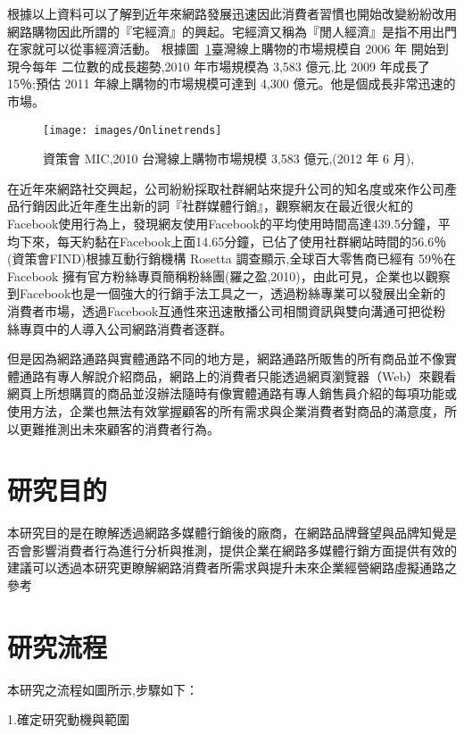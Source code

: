 根據以上資料可以了解到近年來網路發展迅速因此消費者習慣也開始改變紛紛改用網路購物因此所謂的『宅經濟』的興起。宅經濟又稱為『閒人經濟』是指不用出門在家就可以從事經濟活動。
根據圖~\ref{fig:Onlinetrends}臺灣線上購物的市場規模自 2006 年 開始到現今每年 二位數的成長趨勢,2010 年市場規模為 3,583 億元,比 2009 年成長了 15％;預估 2011 年線上購物的市場規模可達到 4,300 億元\cite{資策會FIND}。他是個成長非常迅速的市場。

\begin{figure}[htbp]
\centering \texttt{[image: images/Onlinetrends]}
\caption{\label{fig:Onlinetrends}資策會 MIC,2010 台灣線上購物市場規模 3,583 億元,(2012 年 6 月),}
\end{figure}

在近年來網路社交興起，公司紛紛採取社群網站來提升公司的知名度或來作公司產品行銷因此近年產生出新的詞『社群媒體行銷』，觀察網友在最近很火紅的Facebook使用行為上，發現網友使用Facebook的平均使用時間高達439.5分鐘，平均下來，每天約黏在Facebook上面14.65分鐘，已佔了使用社群網站時間的56.6％(資策會FIND)根據互動行銷機構 Rosetta 調查顯示,全球百大零售商已經有 59％在 Facebook 擁有官方粉絲專頁簡稱粉絲團(羅之盈,2010)，由此可見，企業也以觀察到Facebook也是一個強大的行銷手法工具之一，透過粉絲專業可以發展出全新的消費者市場，透過Facebook互通性來迅速散播公司相關資訊與雙向溝通可把從粉絲專頁中的人導入公司網路消費者逐群。

但是因為網路通路與實體通路不同的地方是，網路通路所販售的所有商品並不像實體通路有專人解說介紹商品，網路上的消費者只能透過網頁瀏覽器（Web）來觀看網頁上所想購買的商品並沒辦法隨時有像實體通路有專人銷售員介紹的每項功能或使用方法，企業也無法有效掌握顧客的所有需求與企業消費者對商品的滿意度，所以更難推測出未來顧客的消費者行為。



\section{研究目的}
本研究目的是在瞭解透過網路多媒體行銷後的廠商，在網路品牌聲望與品牌知覺是否會影響消費者行為進行分析與推測，提供企業在網路多媒體行銷方面提供有效的建議可以透過本研究更瞭解網路消費者所需求與提升未來企業經營網路虛擬通路之參考


\section{研究流程}

 本研究之流程如圖所示,步驟如下：

1.確定研究動機與範圍

